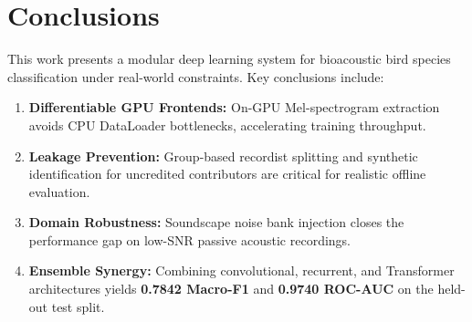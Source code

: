 \documentclass[11pt,a4paper]{article}
\begin{document}
\section{Conclusions}
This work presents a modular deep learning system for bioacoustic bird species classification under real-world constraints. Key conclusions include:
\begin{enumerate}[leftmargin=*]
    \item \textbf{Differentiable GPU Frontends:} On-GPU Mel-spectrogram extraction avoids CPU DataLoader bottlenecks, accelerating training throughput.
    \item \textbf{Leakage Prevention:} Group-based recordist splitting and synthetic identification for uncredited contributors are critical for realistic offline evaluation.
    \item \textbf{Domain Robustness:} Soundscape noise bank injection closes the performance gap on low-SNR passive acoustic recordings.
    \item \textbf{Ensemble Synergy:} Combining convolutional, recurrent, and Transformer architectures yields \textbf{0.7842 Macro-F1} and \textbf{0.9740 ROC-AUC} on the held-out test split.
\end{enumerate}
\end{document}
